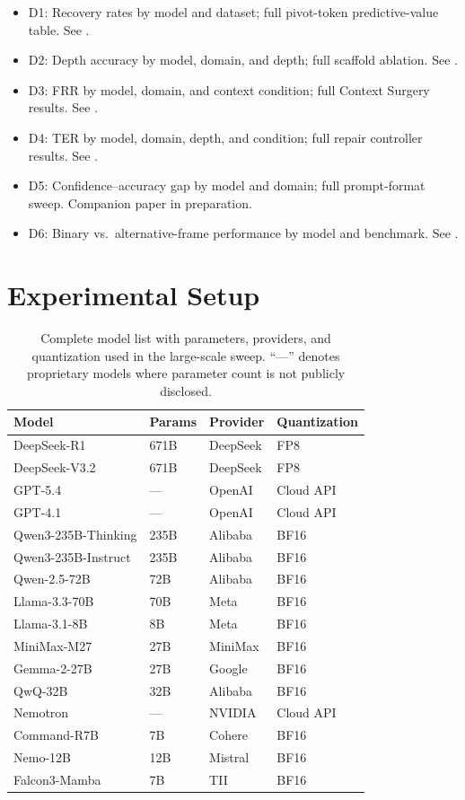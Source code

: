 \documentclass[11pt]{article}
\newcommand{\tighttable}{\setlength{\tabcolsep}{4pt}\renewcommand{\arraystretch}{1.05}}
\begin{document}
\begin{itemize}[noitemsep, topsep=2pt]
\item D1: Recovery rates by model and dataset; full pivot-token
predictive-value table. See \citet{tower2026usemention}.
\item D2: Depth accuracy by model, domain, and depth; full scaffold
ablation. See \citet{tower2026assembly}.
\item D3: FRR by model, domain, and context condition; full Context
Surgery results. See \citet{tower2026lockout}.
\item D4: TER by model, domain, depth, and condition; full repair
controller results. See \citet{tower2026sunkcost}.
\item D5: Confidence--accuracy gap by model and domain; full
prompt-format sweep. Companion paper in preparation.
\item D6: Binary vs.\ alternative-frame performance by model and
benchmark. See \citet{tower2026detection,tower2026vuln}.
\end{itemize}

\section{Experimental Setup}
\label{app:setup}

\begin{table}[H]
\centering\small\tighttable
\begin{tabular}{p{3.5cm}p{1.5cm}p{1.5cm}p{2.5cm}}
\toprule
\textbf{Model} & \textbf{Params} & \textbf{Provider} & \textbf{Quantization} \\
\midrule
DeepSeek-R1 & 671B & DeepSeek & FP8 \\
DeepSeek-V3.2 & 671B & DeepSeek & FP8 \\
GPT-5.4 & --- & OpenAI & Cloud API \\
GPT-4.1 & --- & OpenAI & Cloud API \\
Qwen3-235B-Thinking & 235B & Alibaba & BF16 \\
Qwen3-235B-Instruct & 235B & Alibaba & BF16 \\
Qwen-2.5-72B & 72B & Alibaba & BF16 \\
Llama-3.3-70B & 70B & Meta & BF16 \\
Llama-3.1-8B & 8B & Meta & BF16 \\
MiniMax-M27 & 27B & MiniMax & BF16 \\
Gemma-2-27B & 27B & Google & BF16 \\
QwQ-32B & 32B & Alibaba & BF16 \\
Nemotron & --- & NVIDIA & Cloud API \\
Command-R7B & 7B & Cohere & BF16 \\
Nemo-12B & 12B & Mistral & BF16 \\
Falcon3-Mamba & 7B & TII & BF16 \\
\bottomrule
\end{tabular}
\caption{Complete model list with parameters, providers, and
quantization used in the large-scale sweep. ``---'' denotes
proprietary models where parameter count is not publicly disclosed.}
\label{tab:models}
\end{table}
\end{document}
